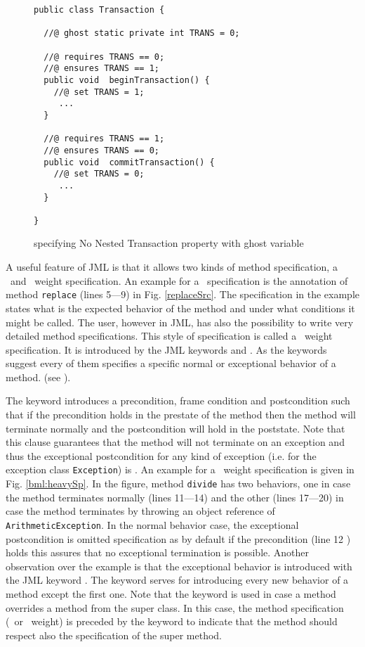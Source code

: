 \begin{figure}[ht!]
\begin{lstlisting}[frame=trbl] 
public class Transaction {

  //@ ghost static private int TRANS = 0; 
  
  //@ requires TRANS == 0;
  //@ ensures TRANS == 1;
  public void  beginTransaction() {
    //@ set TRANS = 1;
     ...
  }

  //@ requires TRANS == 1;
  //@ ensures TRANS == 0;
  public void  commitTransaction() {
    //@ set TRANS = 0; 
     ...
  }
  
}
\end{lstlisting}
\caption{\sc specifying No Nested Transaction property with ghost variable} 
\label{bml:ghost}
\end{figure}

A useful feature of JML is that it allows two kinds of method specification, a \light  \ and \heavy \ weight specification. 
An example for a \light \  specification is the annotation of method \texttt{replace} (lines 5---9) in Fig. \ref{replaceSrc}. The specification in 
the example states what is the expected behavior of the method and under what conditions it might be called.
The user, however in JML, has also the possibility
to write very detailed method specifications. This style of specification is called a \heavy  \ weight specification.
 It is introduced by the JML keywords  and . As the keywords
suggest every of them specifies a specific normal or exceptional behavior of a method.  (see \cite{PD06LBR}). 

The keyword   introduces a precondition, frame condition and postcondition 
such that if the precondition holds in the prestate of the
 method then the method will terminate normally and the postcondition will hold in the poststate.
 Note that this clause guarantees that the method will not terminate on an exception and thus the exceptional postcondition 
for any kind of exception (i.e. for the exception class  \texttt{Exception}) is  .
An example for a \heavy \ weight specification is given in Fig. \ref{bml:heavySp}. In the figure, method \texttt{divide} has 
two behaviors, one in case the method terminates normally (lines 11---14) and the other (lines 17---20) in case the method
 terminates by throwing an object reference of \texttt{ArithmeticException}.
 In the normal behavior case, the exceptional postcondition is omitted  specification as by default if the precondition (line 12 )
 holds this assures that no exceptional
 termination is possible. Another observation over the example is that the exceptional behavior is introduced with the JML keyword . 
 The keyword   serves for introducing every new behavior of a method except the first one. Note that the keyword  
 is used in case a  method overrides a method from the super class. In this case, the method specification (\heavy \ or \light \ weight) is preceded by the keyword  
 to indicate that the method should respect also the specification of the super method.


